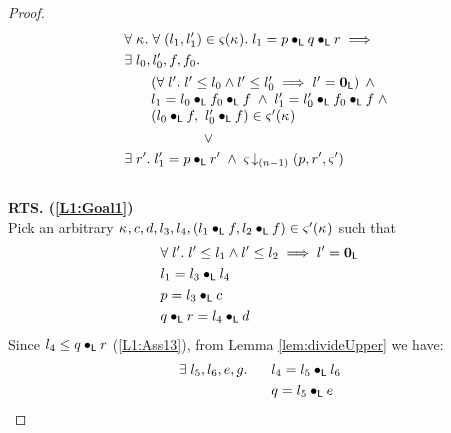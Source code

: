 \begin{lemma}
\begin{proof}
\begin{align}
	&\for{\ca{}} \for{(l_1, l'_1) \in \amod{}(\ca{})} l_1 = p \composeL q \composeL r \implies \nonumber\\
	&\exsts{l_0, l'_0, f, f_0} \nonumber\\
  &\hspace*{0.5cm}
  \begin{array}{l}
  	\left(\for{l'} l' \leq l_0 \land l' \leq l'_0 \implies l' = \unitL\right)\;\land\\
  	l_1 = l_0 \composeL f_0 \composeL f \;\land\; l'_1 = l'_0 \composeL f_0 \composeL f  \;\land\\
  	(l_0 \composeL f,\ l'_0 \composeL f) \in \amod{}'(\ca{}) 
  \end{array} \nonumber\\
%
	&\hspace*{2cm}\lor  \nonumber\\
	&\exsts{r'} l'_1 = p \composeL r' \;\land\; \extendsAMUpto{\amod}{(n-1)}{p}{r'}{\amod{}'}\label{L1:Goal2}\\\nonumber
\end{align}
%
\textbf{RTS. (\ref{L1:Goal1})}\\
Pick an arbitrary $\kappa_{}, c, d, l_3, l_4, (l_1 \bullet_{\textsf{L}} f, l_2 \bullet_{\textsf{L}} f) \in \varsigma_{}'(\kappa_{})$ such that
%
\begin{align}
	&\forall\; l'.\; l' \leq l_1 \land l' \leq l_2 \implies l' = \mathbf{0}_{\textsf{L}} \label{L1:Ass10}\\
	& l_1 = l_3 \bullet_{\textsf{L}} l_4 \label{L1:Ass11}\\
	& p = l_3 \bullet_{\textsf{L}} c \label{L1:Ass12}\\
	& q \bullet_{\textsf{L}} r = l_4 \bullet_{\textsf{L}} d \label{L1:Ass13}
\end{align}
Since $l_4 \leq q \bullet_{\textsf{L}} r$ (\ref{L1:Ass13}), from Lemma \ref{lem:divideUpper} we have:
%
\begin{align}
	\exsts{l_5, l_6, e, g} \hspace*{0.5cm} & l_4 = l_5 \composeL l_6 \label{L1:Ass15}\\
	& q = l_5 \composeL e \label{L1:Ass16}\\

\end{align}
\end{proof}
\end{lemma}
